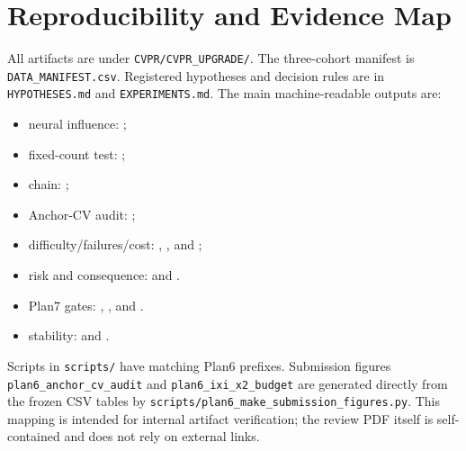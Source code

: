 \documentclass[10pt,twocolumn,letterpaper]{article}
\begin{document}
\section{Reproducibility and Evidence Map}
All artifacts are under \texttt{CVPR/CVPR\_UPGRADE/}. The three-cohort manifest is \texttt{DATA\_MANIFEST.csv}. Registered hypotheses and decision rules are in \texttt{HYPOTHESES.md} and \texttt{EXPERIMENTS.md}. The main machine-readable outputs are:
\begin{itemize}
\item neural influence: ;
\item fixed-count test: ;
\item chain: ;
\item Anchor-CV audit: ;
\item difficulty/failures/cost: , , and ;
\item risk and consequence:  and .
\item Plan7 gates: , , and .
\item stability:  and .
\end{itemize}
Scripts in \texttt{scripts/} have matching Plan6 prefixes. Submission figures \texttt{plan6\_anchor\_cv\_audit} and \texttt{plan6\_ixi\_x2\_budget} are generated directly from the frozen CSV tables by \texttt{scripts/plan6\_make\_submission\_figures.py}. This mapping is intended for internal artifact verification; the review PDF itself is self-contained and does not rely on external links.
\end{document}
